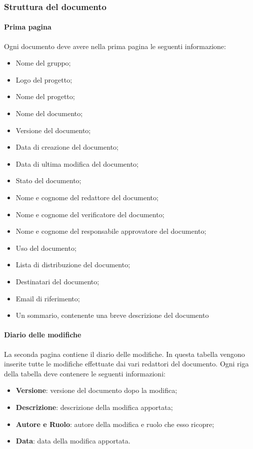 \subsubsection{Struttura del documento}
\paragraph{Prima pagina}

Ogni documento deve avere nella prima pagina le seguenti informazione:
\begin{itemize}
  \item Nome del gruppo;
  \item Logo del progetto;
  \item Nome del progetto;
  \item Nome del documento;
  \item Versione del documento;
  \item Data di creazione del documento;
  \item Data di ultima modifica del documento;
  \item Stato del documento;
  \item Nome e cognome del redattore del documento;
  \item Nome e cognome del verificatore del documento;
  \item Nome e cognome del responsabile approvatore del documento;
  \item Uso del documento;
  \item Lista di distribuzione del documento;
  \item Destinatari del documento;
  \item Email di riferimento;
  \item Un sommario, contenente una breve descrizione del documento
\end{itemize} 
\paragraph{Diario delle modifiche}
La seconda pagina contiene il diario delle modifiche. In questa tabella vengono 
inserite tutte le modifiche effettuate dai vari redattori del documento. Ogni 
riga della tabella deve contenere le seguenti informazioni:
\begin{itemize}
  \item \textbf{Versione}: versione del documento dopo la modifica;
  \item \textbf{Descrizione}: descrizione della modifica apportata;
  \item \textbf{Autore e Ruolo}: autore della modifica e ruolo che esso ricopre;
  \item \textbf{Data}: data della modifica apportata.
\end{itemize}

